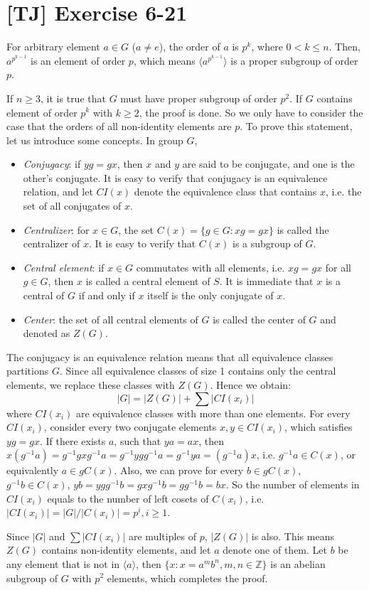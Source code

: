 \documentclass[a4paper,11pt,twocolumn]{article}
\begin{document}
  \section{[TJ] Exercise 6-21}
  For arbitrary element $a \in G$ ($a \neq e$), the order of $a$ is $p^k$, where $0 < k \leq n$. Then, $a^{p^{k-1}}$ is an element of order $p$, which means $\langle a^{p^{k-1}} \rangle$ is a proper subgroup of order $p$. \par
  If $n \geq 3$, it is true that $G$ must have proper subgroup of order $p^2$. If $G$ contains element of order $p^k$ with $k \geq 2$, the proof is done. So we only have to consider the case that the orders of all non-identity elements are $p$. To prove this statement, let us introduce some concepts. In group $G$,
  \begin{itemize}
    \item \emph{Conjugacy}: if $y g = g x$, then $x$ and $y$ are said to be conjugate, and one is the other's conjugate. It is easy to verify that conjugacy is an equivalence relation, and let $CI(x)$ denote the equivalence class that contains $x$, i.e. the set of all conjugates of $x$.
    \item \emph{Centralizer}: for $x \in G$, the set $C(x) = \{g \in G : xg = gx \}$ is called the centralizer of $x$. It is easy to verify that $C(x)$ is a subgroup of $G$.
    \item \emph{Central element}: if $x \in G$ commutates with all elements, i.e. $xg = gx$ for all $g \in G$, then $x$ is called a central element of $S$. It is immediate that $x$ is a central of $G$ if and only if $x$ itself is the only conjugate of $x$.
    \item \emph{Center}: the set of all central elements of $G$ is called the center of $G$ and denoted as $Z(G)$.
  \end{itemize}
  The conjugacy is an equivalence relation means that all equivalence classes partitions $G$. Since all equivalence classes of size 1 contains only the central elements, we replace these classes with $Z(G)$. Hence we obtain:
  $$ |G| = |Z(G)| + \sum |CI(x_i)| $$
  where $CI(x_i)$ are equivalence classes with more than one elements. For every $CI(x_i)$, consider every two conjugate elements $x, y \in CI(x_i)$, which satisfies $ y g = g x $. If there exists $a$, such that $ya = ax$, then $x(g^{-1}a) = g^{-1}gxg^{-1}a = g^{-1}ygg^{-1}a = g^{-1}ya = (g^{-1}a)x$, i.e. $g^{-1}a \in C(x)$, or equivalently $a \in gC(x)$. Also, we can prove for every $b \in gC(x)$, $g^{-1}b \in C(x)$, $yb = ygg^{-1}b = gxg^{-1}b = gg^{-1}b = bx$. So the number of elements in $CI(x_i)$ equals to the number of left cosets of $C(x_i)$, i.e. $|CI(x_i)| = |G|/|C(x_i)| = p^i, i \geq 1$. \par
Since $|G|$ and $\sum |CI(x_i)|$ are multiples of $p$, $|Z(G)|$ is also. This means $Z(G)$ contains non-identity elements, and let $a$ denote one of them. Let $b$ be any element that is not in $\langle a \rangle$, then $\{x : x = a^m b^n, m,n \in \mathbb{Z}\}$ is an abelian subgroup of $G$ with $p^2$ elements, which completes the proof.
\end{document}
